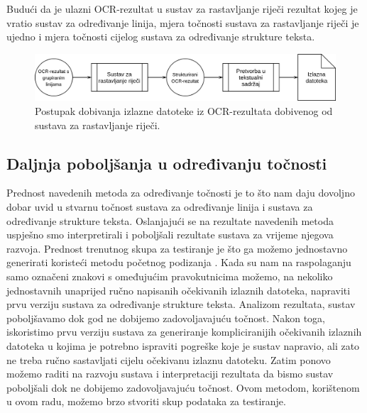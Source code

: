 \documentclass[times, utf8, zavrsni]{fer}
\begin{document}
Budući da je ulazni OCR-rezultat u sustav za rastavljanje riječi rezultat kojeg je vratio sustav za određivanje linija, mjera točnosti sustava za rastavljanje riječi je ujedno i mjera točnosti cijelog sustava za određivanje strukture teksta.

\begin{figure}[htb]
    \centering
    \captionsetup{justification=centering,margin=2cm}
    \includegraphics[width=\textwidth]{images/sustav-05.png}
    \caption{
        Postupak dobivanja izlazne datoteke iz OCR-rezultata dobivenog od
        sustava za rastavljanje riječi.
    }
    \label{fig:sustav-05}
\end{figure}

\subsection{Daljnja poboljšanja u određivanju točnosti}
Prednost navedenih metoda za određivanje točnosti je to što nam daju dovoljno dobar uvid u stvarnu točnost sustava za određivanje linija i sustava za određivanje strukture teksta. Oslanjajući se na rezultate navedenih metoda uspješno smo interpretirali i poboljšali rezultate sustava za vrijeme njegova razvoja. Prednost trenutnog skupa za testiranje je što ga možemo jednostavno generirati koristeći metodu početnog podizanja . Kada su nam na raspolaganju samo označeni znakovi s omeđujućim pravokutnicima možemo, na nekoliko jednostavnih unaprijed ručno napisanih očekivanih izlaznih datoteka, napraviti prvu verziju sustava za određivanje strukture teksta. Analizom rezultata, sustav poboljšavamo dok god ne dobijemo zadovoljavajuću točnost. Nakon toga, iskoristimo prvu verziju sustava za generiranje kompliciranijih očekivanih izlaznih datoteka u kojima je potrebno ispraviti pogreške koje je sustav napravio, ali zato ne treba ručno sastavljati cijelu očekivanu izlaznu datoteku. Zatim ponovo možemo raditi na razvoju sustava i interpretaciji rezultata da bismo sustav poboljšali dok ne dobijemo zadovoljavajuću točnost. Ovom metodom, korištenom u ovom radu, možemo brzo stvoriti skup podataka za testiranje.
\end{document}
